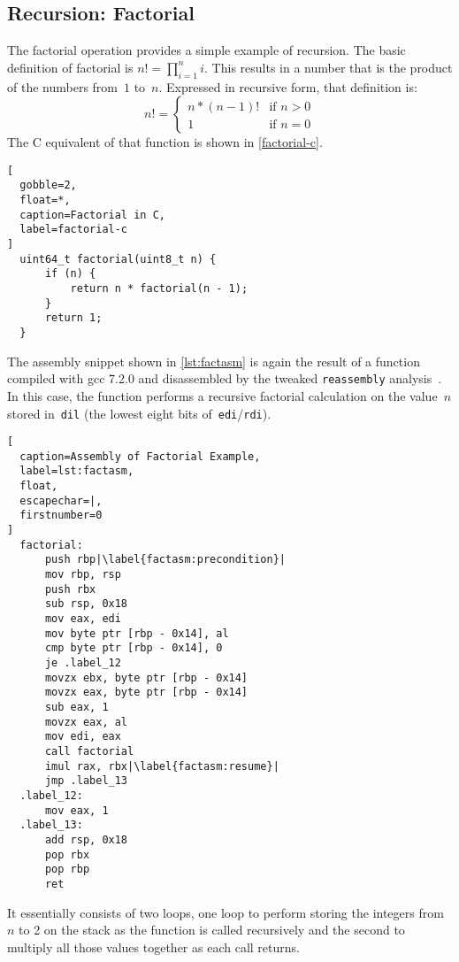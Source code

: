 \subsection{Recursion: Factorial}\label{sse:cfg_factorial}
The factorial operation provides a simple example of recursion.%
%
The basic definition of factorial is $n!=\prod_{i=1}^n i$.%
This results in a number that is the product of the numbers from~$1$ to~$n$.
Expressed in recursive form, that definition is:
\begin{equation}
  n!=\begin{cases}
    n * (n - 1)! & \text{if }n > 0 \\
    1 & \text{if }n = 0
  \end{cases}
\end{equation}
The C equivalent of that function is shown in \cref{factorial-c}.
\begin{lstlisting}[
  gobble=2,
  float=*,
  caption=Factorial in C,
  label=factorial-c
]
  uint64_t factorial(uint8_t n) {
      if (n) {
          return n * factorial(n - 1);
      }
      return 1;
  }
\end{lstlisting}
The assembly snippet shown in \cref{lst:factasm} is again
the result of a function compiled with \ac{gcc} 7.2.0
and disassembled by the tweaked \lstinline|reassembly| analysis~\citep{wang2017ramblr}.
In this case, the function performs a recursive factorial calculation on the value~$n$
stored in~\lstinline|dil| (the lowest eight bits of~\lstinline|edi|/\lstinline|rdi|).
\begin{lstlisting}[
  caption=Assembly of Factorial Example,
  label=lst:factasm,
  float,
  escapechar=|,
  firstnumber=0
]
  factorial:
      push rbp|\label{factasm:precondition}|
      mov rbp, rsp
      push rbx
      sub rsp, 0x18
      mov eax, edi
      mov byte ptr [rbp - 0x14], al
      cmp byte ptr [rbp - 0x14], 0
      je .label_12
      movzx ebx, byte ptr [rbp - 0x14]
      movzx eax, byte ptr [rbp - 0x14]
      sub eax, 1
      movzx eax, al
      mov edi, eax
      call factorial
      imul rax, rbx|\label{factasm:resume}|
      jmp .label_13
  .label_12:
      mov eax, 1
  .label_13:
      add rsp, 0x18
      pop rbx
      pop rbp
      ret
\end{lstlisting}
It essentially consists of two loops,
one loop to perform storing the integers from~$n$ to 2 on the stack as the function
is called recursively
and the second to multiply all those values together as each call returns.

